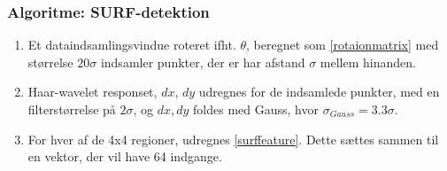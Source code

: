 \subsubsection*{Algoritme: SURF-detektion}
\begin{enumerate}
\item Et dataindsamlingsvindue roteret ifht. $\theta$, beregnet som \eqref{rotaionmatrix} med størrelse $20\sigma$ indsamler punkter, der er har afstand $\sigma$ mellem hinanden.
\item Haar-wavelet responset, $dx$, $dy$ udregnes for de indsamlede punkter, med en filterstørrelse på $2\sigma$, og $dx, dy$ foldes med Gauss, hvor $\sigma_{Gauss} = 3.3\sigma$.
\item For hver af de 4x4 regioner, udregnes \eqref{surffeature}. Dette sættes sammen til en vektor, der vil have 64 indgange.
\end{enumerate}